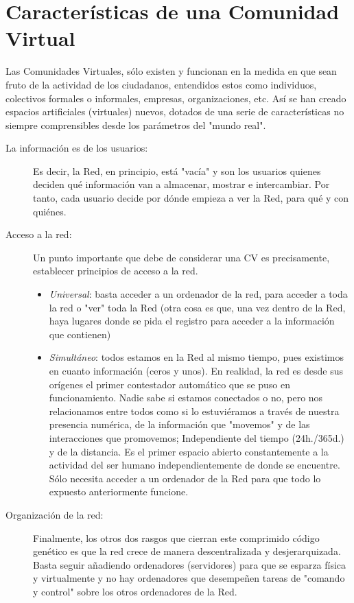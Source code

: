 
\section{Características de una Comunidad Virtual}

Las Comunidades Virtuales, sólo existen y funcionan en la medida en que sean fruto de la actividad de los ciudadanos, entendidos estos como individuos, colectivos formales o informales, empresas, organizaciones, etc. Así se han creado espacios artificiales (virtuales) nuevos, dotados de una serie de características no siempre comprensibles desde los parámetros del "mundo real". 

\begin{description}
\item[La información es de los usuarios: ]
Es decir, la Red, en principio, está "vacía" y son los usuarios quienes deciden qué información van a almacenar, mostrar e intercambiar. Por tanto, cada usuario decide por dónde empieza a ver la Red, para qué y con quiénes.


\item[Acceso a la red: ] 
Un punto importante que debe de considerar una CV es precisamente, establecer principios de acceso a la red. 

\begin{itemize}
\item \emph{Universal}: basta acceder a un ordenador de la red, para acceder a toda la red o "ver" toda la Red (otra cosa es que, una vez dentro de la Red, haya lugares donde se pida el registro para acceder a la información que contienen)
\item \emph{Simultáneo}: todos estamos en la Red al mismo tiempo, pues existimos en cuanto información (ceros y unos). En realidad, la red es desde sus orígenes el primer contestador automático que se puso en funcionamiento. Nadie sabe si estamos conectados o no, pero nos relacionamos entre todos como si lo estuviéramos a través de nuestra presencia numérica, de la información que "movemos" y de las interacciones que promovemos; Independiente del tiempo (24h./365d.) y de la distancia. Es el primer espacio abierto constantemente a la actividad del ser humano independientemente de donde se encuentre. Sólo necesita acceder a un ordenador de la Red para que todo lo expuesto anteriormente funcione.

\end{itemize}

\item[Organización de la red: ] Finalmente, los otros dos rasgos que cierran este comprimido código genético es que la red crece de manera descentralizada y desjerarquizada. Basta seguir añadiendo ordenadores (servidores) para que se esparza física y virtualmente y no hay ordenadores que desempeñen tareas de "comando y control" sobre los otros ordenadores de la Red.

\end{description}


